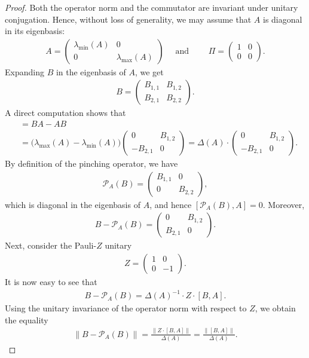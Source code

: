 \documentclass[a4paper,onecolumn,11pt]{quantumarticle}
\theoremstyle{plain}
\begin{document}
\begin{proof}
Both the operator norm and the commutator are invariant under unitary conjugation. Hence, without loss of generality, we may assume that $A$ is diagonal in its eigenbasis:
\begin{align}
A =
\begin{pmatrix}
\lambda_{\min}(A) & 0 \\
0 & \lambda_{\max}(A)
\end{pmatrix} \quad \text{ and } \quad
\quad
\Pi =
\begin{pmatrix}
1 & 0 \\
0 & 0
\end{pmatrix}.
\end{align}
Expanding $B$ in the eigenbasis of $A$, we get
\begin{align}
B =
\begin{pmatrix}
B_{1,1} & B_{1,2} \\
B_{2,1} & B_{2,2}
\end{pmatrix}.
\end{align}
A direct computation shows that
\begin{align}
[B,A]
&= BA - AB \\
&= \bigl(\lambda_{\max}(A) - \lambda_{\min}(A)\bigr)
\begin{pmatrix}
0 & B_{1,2} \\
-B_{2,1} & 0
\end{pmatrix}
= \Delta(A) \cdot
\begin{pmatrix}
0 & B_{1,2} \\
-B_{2,1} & 0
\end{pmatrix}.
\end{align}
By definition of the pinching operator, we have
\begin{align}
\mathcal{P}_A(B)
=
\begin{pmatrix}
B_{1,1} & 0 \\
0 & B_{2,2}
\end{pmatrix},
\end{align}
which is diagonal in the eigenbasis of $A$, and hence $[\mathcal{P}_A(B),A]=0$. Moreover,
\begin{align}
B - \mathcal{P}_A(B)
=
\begin{pmatrix}
0 & B_{1,2} \\
B_{2,1} & 0
\end{pmatrix}.
\end{align}
Next, consider the Pauli-$Z$ unitary
\begin{align}
Z=\begin{pmatrix}
1 & 0 \\
0 & -1
\end{pmatrix}.  
\end{align}
It is now easy to see that
\begin{align}
B - \mathcal{P}_A(B) = \Delta(A)^{-1}\cdot Z \cdot [B,A].
\end{align}
Using the unitary invariance of the operator norm with respect to $Z$,
we obtain the equality
\begin{align}
\|B - \mathcal{P}_A(B)\|
= \frac{\|Z\cdot [B,A]\|}{\Delta(A)} = \frac{\|[B,A]\|}{\Delta(A)}.
\end{align}
\end{proof}
\end{document}
